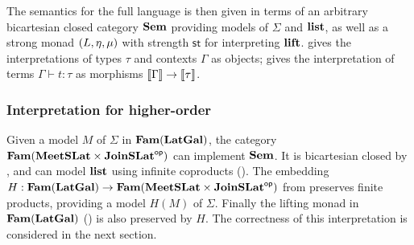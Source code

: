 The semantics for the full language is then given in terms of an arbitrary bicartesian closed category $\mathbf{Sem}$
providing models of $\Sigma$ and $\mathbf{list}$, as well as a strong monad $(L, \eta, \mu)$ with strength
$\mathsf{st}$ for interpreting $\mathbf{lift}$.  gives the interpretations of types $\tau$
and contexts $\Gamma$ as objects;  gives the interpretation of terms $\Gamma \vdash t:
\tau$ as morphisms $\llbracket \Gamma \rrbracket \to \llbracket \tau \rrbracket$.

\subsubsection{Interpretation for higher-order \GPS}

Given a model $M$ of $\Sigma$ in $\mathbf{Fam}(\mathbf{LatGal})$, the category $\mathbf{Fam}(\mathbf{MeetSLat} \times \mathbf{JoinSLat}^{\mathsf{op}})$ can
implement $\mathbf{Sem}$. It is bicartesian closed by , and can model $\mathbf{list}$ using infinite
coproducts (). The embedding $H: \mathbf{Fam}(\mathbf{LatGal}) \to
\mathbf{Fam}(\mathbf{MeetSLat} \times \mathbf{JoinSLat}^{\mathsf{op}})$ from  preserves finite products, providing a model
$H(M)$ of $\Sigma$. Finally the lifting monad in $\mathbf{Fam}(\mathbf{LatGal})$ () is also
preserved by $H$. The correctness of this interpretation is considered in the next section.
